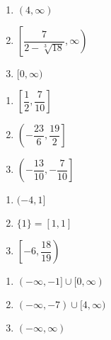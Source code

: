 \documentclass{ximera}
\begin{document}
\begin{multicols}{3}
\begin{enumerate}
\setcounter{enumi}{\value{HW}}

\item $(4, \infty)$\vphantom{$\left[ \dfrac{7}{2 - \sqrt[3]{18}}, \infty\right)$
}

\item  $\left[ \dfrac{7}{2 - \sqrt[3]{18}}, \infty\right)$

\item   $[0, \infty)$\vphantom{$\left[ \dfrac{7}{2 - \sqrt[3]{18}}, \infty\right)$
}

\setcounter{HW}{\value{enumi}}
\end{enumerate}
\end{multicols}


\begin{multicols}{3}
\begin{enumerate}
\setcounter{enumi}{\value{HW}}

\item $\left[ \dfrac{1}{2}, \dfrac{7}{10}\right]$
\item $\left(-\dfrac{23}{6}, \dfrac{19}{2} \right]$
\item $\left(-\dfrac{13}{10}, -\dfrac{7}{10} \right]$

\setcounter{HW}{\value{enumi}}
\end{enumerate}
\end{multicols}

\begin{multicols}{3}
\begin{enumerate}
\setcounter{enumi}{\value{HW}}
\item  $(-4,1]$\vphantom{$\left[-6, \dfrac{18}{19} \right)$}

\item  $\{1 \} = [1,1]$ \vphantom{$\left[-6, \dfrac{18}{19} \right)$}

\item  $\left[-6, \dfrac{18}{19} \right)$

\setcounter{HW}{\value{enumi}}
\end{enumerate}
\end{multicols}


\begin{multicols}{3}
\begin{enumerate}
\setcounter{enumi}{\value{HW}}
\item  $(-\infty, -1] \cup [0, \infty)$ 
\item   $(-\infty, -7) \cup [4, \infty)$
\item   $(-\infty, \infty)$

\setcounter{HW}{\value{enumi}}
\end{enumerate}
\end{multicols}
\end{document}
